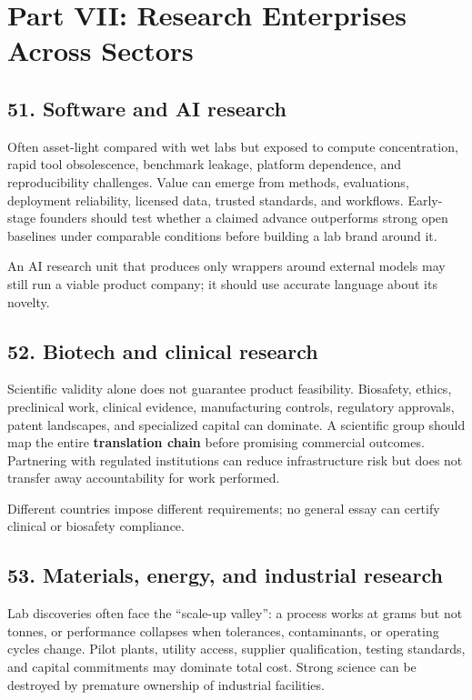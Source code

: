 \section{Part VII: Research Enterprises Across Sectors}

\subsection{51. Software and AI research}

Often asset-light compared with wet labs but exposed to compute concentration, rapid tool obsolescence, benchmark leakage, platform dependence, and reproducibility challenges. Value can emerge from methods, evaluations, deployment reliability, licensed data, trusted standards, and workflows. Early-stage founders should test whether a claimed advance outperforms strong open baselines under comparable conditions before building a lab brand around it.

An AI research unit that produces only wrappers around external models may still run a viable product company; it should use accurate language about its novelty.

\subsection{52. Biotech and clinical research}

Scientific validity alone does not guarantee product feasibility. Biosafety, ethics, preclinical work, clinical evidence, manufacturing controls, regulatory approvals, patent landscapes, and specialized capital can dominate. A scientific group should map the entire \textbf{translation chain} before promising commercial outcomes. Partnering with regulated institutions can reduce infrastructure risk but does not transfer away accountability for work performed.

Different countries impose different requirements; no general essay can certify clinical or biosafety compliance.

\subsection{53. Materials, energy, and industrial research}

Lab discoveries often face the ``scale-up valley'': a process works at grams but not tonnes, or performance collapses when tolerances, contaminants, or operating cycles change. Pilot plants, utility access, supplier qualification, testing standards, and capital commitments may dominate total cost. Strong science can be destroyed by premature ownership of industrial facilities.

